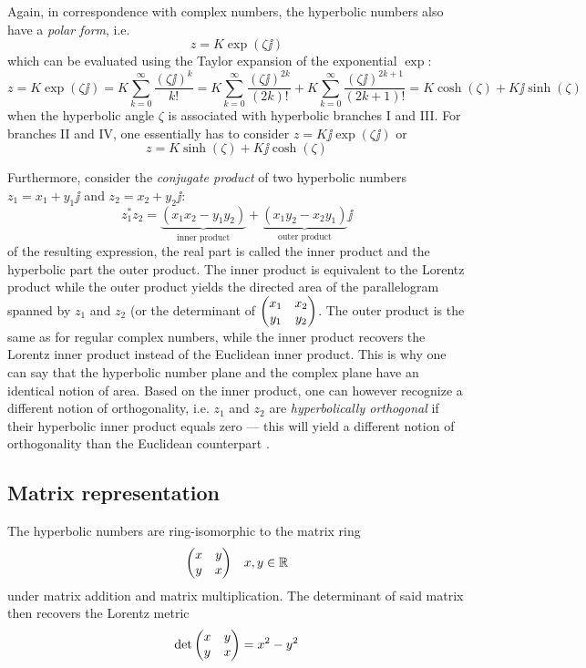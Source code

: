 Again, in correspondence with complex numbers, the hyperbolic numbers also have a  \emph{polar form}, i.e.
$$z = K \exp(\zeta \jj)$$
which can be evaluated using the Taylor expansion of the exponential $\exp$:
$$z = K\exp(\zeta \jj) = K \sum^\infty_{k = 0} \frac{(\zeta \jj)^k}{k!} =  K \sum^\infty_{k = 0} \frac{(\zeta \jj)^{2k}}{(2k)!} + K \sum^\infty_{k = 0} \frac{(\zeta \jj)^{2k+1}}{(2k + 1)!} = K\cosh(\zeta) + K\jj\sinh(\zeta)$$
when the hyperbolic angle $\zeta$ is associated with hyperbolic branches I and III. For branches II and IV, one essentially has to consider $z = K\jj\exp(\zeta\jj)$ or
$$z = K\sinh(\zeta) + K\jj\cosh(\zeta) $$

Furthermore, consider the \emph{conjugate product} of two hyperbolic numbers $z_1 = x_1 + y_1\jj$ and $z_2 = x_2 + y_2\jj$:
$$ z_1^*z_2 = \underbrace{(x_1x_2 - y_1y_2)}_\text{inner product} 
            + \underbrace{(x_1y_2 - x_2y_1)}_\text{outer product}\jj $$
of the resulting expression, the real part is called the inner product and the hyperbolic part the outer product. The inner product is equivalent to the Lorentz product while the outer product yields the directed area of the parallelogram spanned by $z_1$ and $z_2$ (or the determinant of $\mqty(x_1 & x_2\\y_1&y_2)$. The outer product is the same as for regular complex numbers, while the inner product recovers the Lorentz inner product instead of the Euclidean inner product. This is why one can say that the hyperbolic number plane and the complex plane have an identical notion of area. Based on the inner product, one can however recognize a different notion of orthogonality, i.e. $z_1$ and $z_2$ are \emph{hyperbolically orthogonal} if their hyperbolic inner product equals zero --- this will yield a different notion of orthogonality than the Euclidean counterpart \cite{Needham1997, Sobczyk1995}.

\subsection{Matrix representation}
The hyperbolic numbers are ring-isomorphic to the matrix ring
$$ \mqty(x & y \\ y & x) \quad x, y \in \real$$
under matrix addition and matrix multiplication. The determinant of said matrix then recovers the Lorentz metric
$$ \det \mqty(x & y \\ y & x) = x^2 - y^2$$

